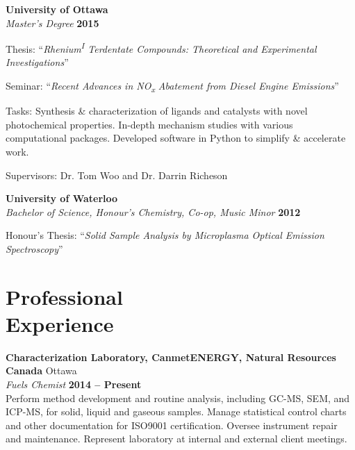 \documentclass[margin,line]{resume}
\begin{document}
\begin{resume}
    \textbf{University of Ottawa}\\\vspace{1mm}%
    \textsl{Master's Degree} \hfill \textbf{2015}\vspace{-3mm}\\\vspace{-1mm}%
    \begin{list2}
        \item Thesis: ``\textit{Rhenium\textsuperscript{I} Terdentate Compounds: Theoretical and Experimental Investigations}''
        \item Seminar: ``\textit{Recent Advances in NO\textsubscript{x} Abatement from Diesel Engine Emissions}''
        \item Tasks: Synthesis \& characterization of ligands and catalysts with novel photochemical properties. In-depth mechanism studies with various computational packages. Developed software in Python to simplify \& accelerate work.
        \item Supervisors: Dr. Tom Woo and Dr. Darrin Richeson
    \end{list2}

    \textbf{University of Waterloo}\\\vspace{1mm}%
    \textsl{Bachelor of Science, Honour's Chemistry, Co-op, Music Minor} \hfill \textbf{2012}\vspace{-3mm}\\\vspace{-1mm}%
    \begin{list2}
        \item Honour's Thesis: ``\textit{Solid Sample Analysis by Microplasma Optical Emission Spectroscopy}''
    \end{list2}

    \section{\mysidestyle Professional\\Experience}

    \textbf{Characterization Laboratory, CanmetENERGY, Natural Resources Canada} \hfill Ottawa \\\vspace{1mm}%
    \textsl{Fuels Chemist} \hfill \textbf{2014 -- Present}\\
    Perform method development and routine analysis, including GC-MS, SEM, and ICP-MS, for solid, liquid and gaseous samples. Manage statistical control charts and other documentation for ISO9001 certification. Oversee instrument repair and maintenance. Represent laboratory at internal and external client meetings. 
    


\end{resume}
\end{document}
